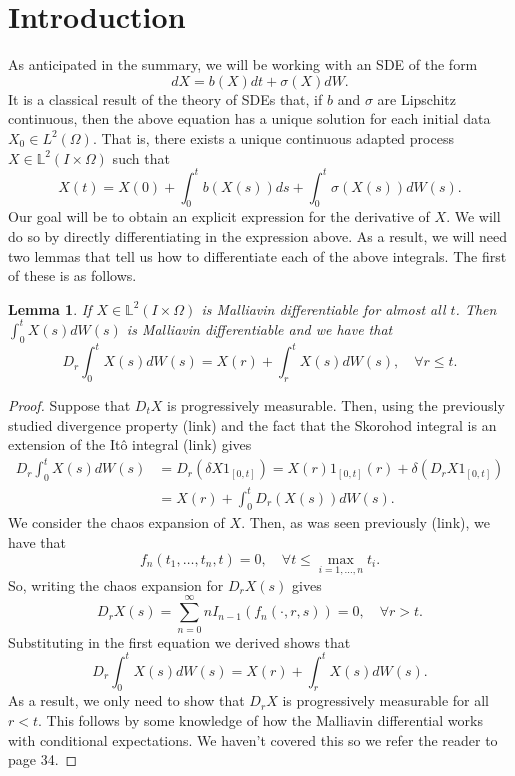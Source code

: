 \documentclass[12pt]{article}
\newtheorem{lemma}{Lemma}
\begin{document}
\section{Introduction}
As anticipated in the summary, we will be working with an SDE of the form
\begin{equation}\label{SDE}
	dX=b(X) d t +\sigma (X)dW .
\end{equation}
It is a classical result of the theory of SDEs that, if $b$ and  $\sigma $ are Lipschitz continuous, then the above equation has a unique solution for each initial data $X_0\in L^2(\Omega)$. That is, there exists a unique continuous adapted process $X\in \mathbb{L}^2(I\times\Omega)$ such that
\begin{equation}\label{X expression}
	X(t)=X(0)+\int_{0}^t b(X(s)) ds+\int_{0}^t \sigma(X(s))  dW(s).
\end{equation}
Our goal will be to obtain an explicit expression for the derivative of $X$. We will do so by directly differentiating in the expression above. As a result, we will need two lemmas that tell us how to differentiate each of the above integrals. The first of these is as follows.
\begin{lemma}
	If $X\in \mathbb{L}^2(I\times\Omega)$ is  Malliavin differentiable for almost all $t$. Then $\int_{0}^t X(s) dW(s)$ is Malliavin differentiable and we have that
	\begin{equation*}
		D_r \int_{0}^t X(s) dW(s)=X(r)+\int_{r}^t X(s) dW(s), \quad\forall r\leq t.
	\end{equation*}
\end{lemma}
\begin{proof}
	Suppose that $D_tX$ is progressively measurable. Then, using the previously studied divergence property (link) and the fact that the Skorohod integral is an extension of the Itô integral (link) gives
	\begin{align*}
		D_r \int_{0}^t X(s) dW(s) & =D_r(\delta X1_{[0,t]}) =X(r)1_{[0,t]}(r)+\delta (D_rX1_{[0,t]}) \\&=X(r)+\int_{0}^t D_r(X(s)) dW(s).
	\end{align*}
	We consider the chaos expansion of $X$. Then, as was seen previously (link), we have that
	\begin{equation*}
		f_n(t_1,\ldots,t_n,t)=0,\quad\forall t\leq\max_{i=1,\ldots,n} t_i .
	\end{equation*}
	So, writing the chaos expansion for $D_rX(s)$  gives
	\begin{equation*}
		D_rX(s)=\sum_{n=0}^{\infty}  nI_{n-1}(f_n(\cdot ,r,s))=0, \quad\forall r>t.
	\end{equation*}
	Substituting in the first equation we derived shows that
	\begin{equation*}
		D_r \int_{0}^t X(s) dW(s)=X(r)+\int_{r}^t X(s) dW(s).
	\end{equation*}
	As a result, we only need to show that $D_r X$ is progressively measurable for all $r<t$.	This follows by some knowledge of how the Malliavin differential works with conditional expectations. We haven't covered this so we refer the reader to \cite{nunno2008malliavin} page 34.
\end{proof}
\end{document}
